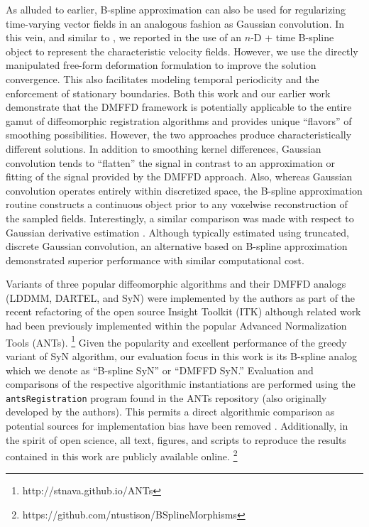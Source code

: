 \documentclass{frontiersSCNS}
\begin{document}
As alluded to earlier, B-spline approximation can also be used
for regularizing time-varying vector fields in an analogous fashion as
Gaussian convolution.  In this vein, and similar to
\cite{de-craene2011}, we reported in \cite{tustison2012a,tustison2012}
the use of an $n$-D + time B-spline object to
represent the characteristic velocity fields.  However, we use the
directly manipulated free-form deformation formulation to improve the solution convergence.  This also facilitates modeling
temporal periodicity and the enforcement of stationary boundaries.
Both this work and our earlier work
\citep{tustison2009} demonstrate that the DMFFD framework is potentially
applicable to the
entire gamut of diffeomorphic registration algorithms and provides
unique ``flavors'' of smoothing possibilities.  However, 
the two approaches produce characteristically different
solutions.  In addition to
smoothing kernel differences, Gaussian
convolution tends to ``flatten'' the signal in contrast to an
approximation or fitting of the signal provided by the DMFFD
approach.  Also, whereas
Gaussian convolution operates entirely within discretized space,
the B-spline approximation routine constructs a continuous object prior
to any voxelwise reconstruction of the sampled fields.  
Interestingly, a similar comparison was made with respect to 
Gaussian derivative estimation  \citep{bourma2007}.  Although 
typically estimated using  truncated, discrete Gaussian 
convolution, an alternative based on 
B-spline approximation demonstrated superior performance with
similar computational cost.  

Variants of three popular diffeomorphic algorithms and their DMFFD analogs
(LDDMM,
DARTEL,
 and SyN)
were implemented by the authors
as part of the recent refactoring of the open source
Insight Toolkit (ITK) although related work had been
previously implemented within the popular Advanced
Normalization Tools (ANTs).%
\footnote{
http://stnava.github.io/ANTs
}
Given the popularity and excellent performance of the greedy variant of SyN algorithm, our evaluation focus in this work is
its B-spline analog which we denote as ``B-spline SyN'' or ``DMFFD SyN.''
Evaluation and comparisons of the respective algorithmic instantiations
are performed using the \verb#antsRegistration# program found
in the ANTs repository (also originally developed by the authors).  This permits a direct algorithmic comparison
as potential sources for implementation bias have been removed \citep{tustison2013}.  Additionally, in the spirit of open science,
all text, figures, and
scripts to reproduce the results contained in this work are publicly available online.%
\footnote{
https://github.com/ntustison/BSplineMorphisms
}
\end{document}
